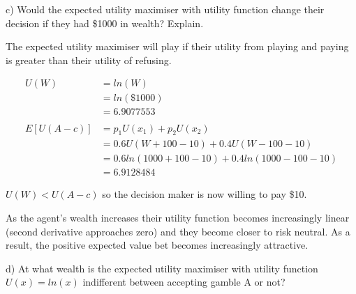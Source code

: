 \documentclass[
  letterpaper,
  DIV=11,
  numbers=noendperiod]{scrreprt}
\begin{document}
c) Would the expected utility maximiser with utility function change
their decision if they had \$1000 in wealth? Explain.

\begin{tcolorbox}[enhanced jigsaw, title=\textcolor{quarto-callout-tip-color}{\faLightbulb}\hspace{0.5em}{Answer}, toprule=.15mm, colback=white, breakable, titlerule=0mm, colframe=quarto-callout-tip-color-frame, coltitle=black, opacityback=0, rightrule=.15mm, colbacktitle=quarto-callout-tip-color!10!white, bottomtitle=1mm, opacitybacktitle=0.6, arc=.35mm, bottomrule=.15mm, toptitle=1mm, leftrule=.75mm, left=2mm]

The expected utility maximiser will play if their utility from playing
and paying is greater than their utility of refusing.

\begin{align*}
U(W)&=ln(W) \\
&=ln(\$1000) \\
&=6.9077553 \\
\\
E[U(A-c)]&=p_1U(x_1)+p_2U(x_2) \\
&=0.6U(W+100-10)+0.4U(W-100-10) \\
&=0.6ln(1000+100-10)+0.4ln(1000-100-10) \\
&=6.9128484
\end{align*}

\(U(W)<U(A-c)\) so the decision maker is now willing to pay \$10.

As the agent's wealth increases their utility function becomes
increasingly linear (second derivative approaches zero) and they become
closer to risk neutral. As a result, the positive expected value bet
becomes increasingly attractive.

\end{tcolorbox}

d) At what wealth is the expected utility maximiser with utility
function \(U(x)=ln(x)\) indifferent between accepting gamble A or not?
\end{document}
